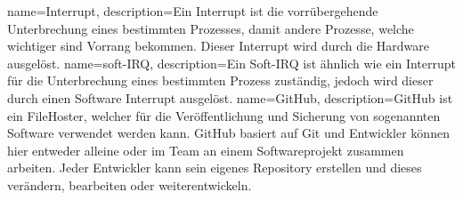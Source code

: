 {
  name=Interrupt,
  description={Ein Interrupt ist die vorrübergehende Unterbrechung eines bestimmten
              Prozesses, damit andere Prozesse, welche wichtiger sind Vorrang bekommen.
              Dieser Interrupt wird durch die Hardware ausgelöst.}
}
{
  name=soft-IRQ,
  description={Ein Soft-IRQ ist ähnlich wie ein \gls{Interrupt} für die Unterbrechung
              eines bestimmten Prozess zuständig, jedoch wird dieser durch einen
              Software Interrupt ausgelöst.}
}
{
  name=GitHub,
  description={GitHub ist ein FileHoster, welcher für die Veröffentlichung und Sicherung
              von sogenannten Software verwendet
              werden kann. GitHub basiert auf \gls{Git} und Entwickler können hier
              entweder alleine oder im Team an einem Softwareprojekt zusammen arbeiten.
              Jeder Entwickler kann sein eigenes \gls{Repository} erstellen und dieses
              verändern, bearbeiten oder weiterentwickeln.}
}
